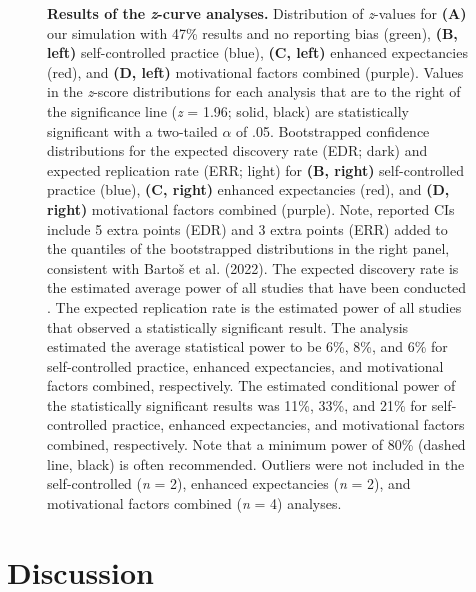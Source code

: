 \documentclass[
  doc, donotrepeattitle,floatsintext]{apa7}
\begin{document}
\begin{figure}
\caption{\normalfont \small \textbf{Results of the \emph{z}-curve analyses.} Distribution of \emph{z}-values for \textbf{(A)} our simulation with 47\% results and no reporting bias (green), \textbf{(B, left)} self-controlled practice (blue), \textbf{(C, left)} enhanced expectancies (red), and \textbf{(D, left)} motivational factors combined (purple). Values in the \emph{z}-score distributions for each analysis that are to the right of the significance line (\emph{z} = 1.96; solid, black) are statistically significant with a two-tailed \(\alpha\) of .05. Bootstrapped confidence distributions for the expected discovery rate (EDR; dark) and expected replication rate (ERR; light) for \textbf{(B, right)} self-controlled practice (blue), \textbf{(C, right)} enhanced expectancies (red), and \textbf{(D, right)} motivational factors combined (purple). Note, reported CIs include 5 extra points (EDR) and 3 extra points (ERR) added to the quantiles of the bootstrapped distributions in the right panel, consistent with Bartoš et al. (2022). The expected discovery rate is the estimated average power of all studies that have been conducted . The expected replication rate is the estimated power of all studies that observed a statistically significant result. The analysis estimated the average statistical power to be 6\%, 8\%, and 6\% for self-controlled practice, enhanced expectancies, and motivational factors combined, respectively. The estimated conditional power of the statistically significant results was 11\%, 33\%, and 21\% for self-controlled practice, enhanced expectancies, and motivational factors combined, respectively. Note that a minimum power of 80\% (dashed line, black) is often recommended. Outliers were not included in the self-controlled (\emph{n} = 2), enhanced expectancies (\emph{n} = 2), and motivational factors combined (\emph{n} = 4) analyses.}\label{fig:fig3}
\end{figure}



\clearpage

\normalsize

\hypertarget{discussion}{%
\section{Discussion}\label{discussion}}
\end{document}

